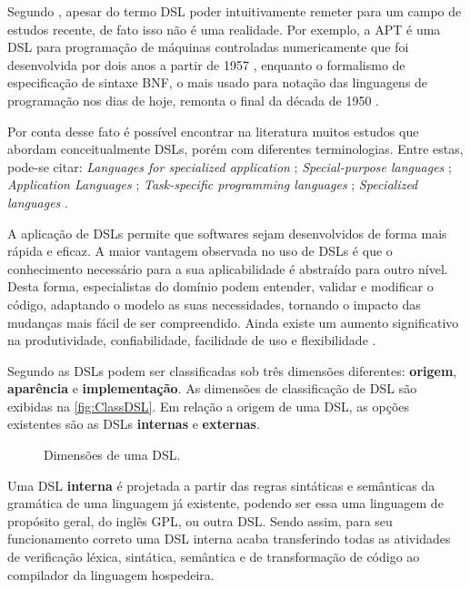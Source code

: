Segundo , apesar do termo \ac{DSL} poder intuitivamente remeter para um campo de estudos recente, de fato isso não é uma realidade. 
Por exemplo, a APT é uma \ac{DSL} para programação de máquinas controladas numericamente que foi desenvolvida por dois anos a partir de 1957 \cite{Ross:1978}, enquanto o formalismo de especificação de sintaxe \ac{BNF}, o mais usado para notação das linguagens de programação nos dias de hoje, remonta o final da década de 1950 \cite{Backus:1959}.
    
Por conta desse fato é possível encontrar na literatura muitos estudos que abordam conceitualmente \acp{DSL}, porém com diferentes terminologias.
Entre estas, pode-se citar: \textit{Languages for specialized application} \cite{Sammet:1972}; \textit{Special-purpose languages} \cite{Wexelblat:1978};  \textit{Application Languages} \cite{Martin:1982}; \textit{Task-specific programming languages} \cite{Nardi:1993}; \textit{Specialized languages} \cite{Bergin:1996}. 
    
A aplicação de \acp{DSL} permite que softwares sejam desenvolvidos de forma mais rápida e eficaz. 
A maior vantagem observada no uso de \acp{DSL} é que o conhecimento necessário para a sua aplicabilidade é abstraído para outro nível. 
Desta forma, especialistas do domínio podem entender, validar e modificar o código, adaptando o modelo as suas necessidades, tornando o impacto das mudanças mais fácil de ser compreendido. 
Ainda existe um aumento significativo na produtividade, confiabilidade, facilidade de uso e flexibilidade \cite{vanDeursen:2000}.

Segundo  as \acp{DSL} podem ser classificadas sob três dimensões diferentes: \textbf{origem}, \textbf{aparência} e \textbf{implementação}. 
As dimensões de classificação de \ac{DSL} são exibidas na \autoref{fig:ClassDSL}. 
Em relação a origem de uma \ac{DSL}, as opções existentes são as \acp{DSL} \textbf{internas} e \textbf{externas}.

\begin{figure}[!htb]
    \centering
    \caption{Dimensões de uma DSL.}
    
    \label{fig:ClassDSL}
\end{figure}
    
Uma \ac{DSL} \textbf{interna} é projetada a partir das regras sintáticas e semânticas da gramática de uma linguagem já existente, podendo ser essa uma linguagem de propósito geral, do inglês \ac{GPL}, ou outra \ac{DSL}. 
Sendo assim, para seu funcionamento correto uma \ac{DSL} interna acaba transferindo todas as atividades de verificação léxica, sintática, semântica e de transformação de código ao compilador da linguagem hospedeira.

